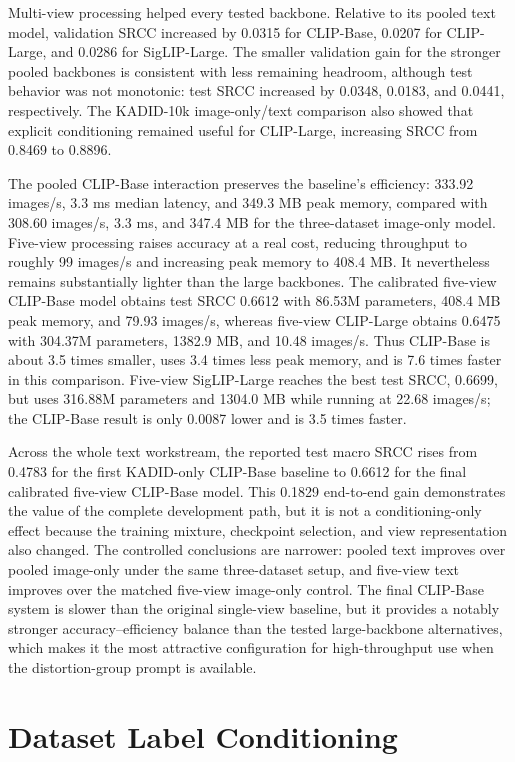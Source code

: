 \documentclass{article}
\begin{document}
Multi-view processing helped every tested backbone. Relative to its pooled text model, validation SRCC increased by 0.0315 for CLIP-Base, 0.0207 for CLIP-Large, and 0.0286 for SigLIP-Large. The smaller validation gain for the stronger pooled backbones is consistent with less remaining headroom, although test behavior was not monotonic: test SRCC increased by 0.0348, 0.0183, and 0.0441, respectively. The KADID-10k image-only/text comparison also showed that explicit conditioning remained useful for CLIP-Large, increasing SRCC from 0.8469 to 0.8896.

The pooled CLIP-Base interaction preserves the baseline's efficiency: 333.92 images/s, 3.3 ms median latency, and 349.3 MB peak memory, compared with 308.60 images/s, 3.3 ms, and 347.4 MB for the three-dataset image-only model. Five-view processing raises accuracy at a real cost, reducing throughput to roughly 99 images/s and increasing peak memory to 408.4 MB. It nevertheless remains substantially lighter than the large backbones. The calibrated five-view CLIP-Base model obtains test SRCC 0.6612 with 86.53M parameters, 408.4 MB peak memory, and 79.93 images/s, whereas five-view CLIP-Large obtains 0.6475 with 304.37M parameters, 1382.9 MB, and 10.48 images/s. Thus CLIP-Base is about 3.5 times smaller, uses 3.4 times less peak memory, and is 7.6 times faster in this comparison. Five-view SigLIP-Large reaches the best test SRCC, 0.6699, but uses 316.88M parameters and 1304.0 MB while running at 22.68 images/s; the CLIP-Base result is only 0.0087 lower and is 3.5 times faster.

Across the whole text workstream, the reported test macro SRCC rises from 0.4783 for the first KADID-only CLIP-Base baseline to 0.6612 for the final calibrated five-view CLIP-Base model. This 0.1829 end-to-end gain demonstrates the value of the complete development path, but it is not a conditioning-only effect because the training mixture, checkpoint selection, and view representation also changed. The controlled conclusions are narrower: pooled text improves over pooled image-only under the same three-dataset setup, and five-view text improves over the matched five-view image-only control. The final CLIP-Base system is slower than the original single-view baseline, but it provides a notably stronger accuracy--efficiency balance than the tested large-backbone alternatives, which makes it the most attractive configuration for high-throughput use when the distortion-group prompt is available.

\section{Dataset Label Conditioning}
\end{document}
